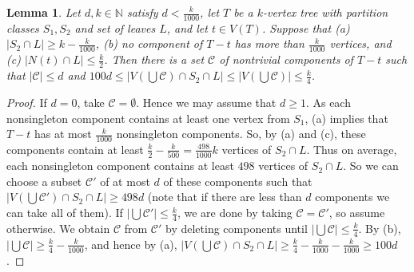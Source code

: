 \documentclass[12pt]{article}
\newtheorem{lemma}[theorem]{Lemma}
\begin{document}

\begin{lemma}\label{180p}
Let $d, k\in\mathbb N$ satisfy $ d<\frac k{1000}$, let $T$ be a $k$-vertex tree with partition classes $S_1, S_2$ and set of leaves $L$, and let $t\in V(T)$. 
 Suppose  
that (a) $|S_2\cap L|\ge k-\frac k{1000}$,  (b) no component of $T-t$ has more than $\frac k{1000}$ vertices, and (c) $|N(t)\cap L|\le \frac k2$. 
    Then there is  a set $\mathcal C$ of  nontrivial components of $T-t$ such that $|\mathcal C|\le d$ and $100 d
    \le 
    |V(\bigcup \mathcal C)\cap S_2\cap L|
    \le |V(\bigcup \mathcal C)|\le \frac k{4}$.
\end{lemma}



\begin{proof}
If $d=0$, take $\mathcal C=\emptyset$. Hence we may assume
that $d\ge 1$.
As each nonsingleton component contains at least one vertex from $S_1$,   (a) implies  that $T-t$ has at most $\frac k{1000}$ nonsingleton components.  So, by (a) and (c), these components contain at least $\frac k2-\frac k{500}=\frac{498}{1000}k$ vertices of $S_2\cap L$. Thus on average, each nonsingleton component contains at least $498$ vertices of $S_2\cap L$. 
So we can choose a subset $\mathcal C'$ of at most $d$ of these components such that $|V(\bigcup\mathcal C')\cap S_2\cap L|\ge 498 d$ (note that if there are less than $d$ components we can take all of them). If $|\bigcup\mathcal C'|\le \frac k4$, we are done by taking $\mathcal C=\mathcal C'$, so assume otherwise. We obtain $\mathcal C$ from $\mathcal C'$ by deleting components until $|\bigcup\mathcal C|\le \frac k4$. By (b), $|\bigcup\mathcal C|\ge \frac k4-\frac k{1000}$, and hence by (a), $|V(\bigcup\mathcal C)\cap S_2\cap L|\ge  \frac k4-\frac k{1000}- \frac k{1000}\ge 100 d$. 
\end{proof}
\end{document}
